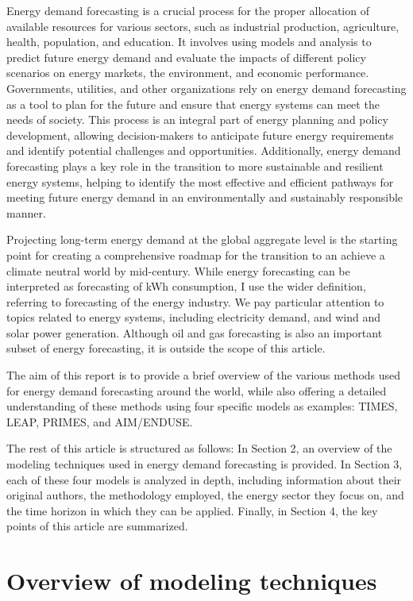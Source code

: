 \documentclass[lettersize,journal]{IEEEtran}
\begin{document}
Energy demand forecasting is a crucial process for the proper allocation of available resources for various sectors, such as industrial production, agriculture, health, population, and education. It involves using models and analysis to predict future energy demand and evaluate the impacts of different policy scenarios on energy markets, the environment, and economic performance. Governments, utilities, and other organizations rely on energy demand forecasting as a tool to plan for the future and ensure that energy systems can meet the needs of society. This process is an integral part of energy planning and policy development, allowing decision-makers to anticipate future energy requirements and identify potential challenges and opportunities. Additionally, energy demand forecasting plays a key role in the transition to more sustainable and resilient energy systems, helping to identify the most effective and efficient pathways for meeting future energy demand in an environmentally and sustainably responsible manner.

Projecting long-term energy demand at the global aggregate level is the starting point for creating a comprehensive roadmap for the transition to an achieve a climate neutral world by mid-century\cite{UNFCCC}. While energy forecasting can be interpreted as forecasting of kWh consumption, I use the wider definition, referring to forecasting of the energy industry. We pay particular attention to topics related to energy systems, including electricity demand, and wind and solar power generation. Although oil and gas forecasting is also an important subset of energy forecasting, it is outside the scope of this article.

The aim of this report is to provide a brief overview of the various methods used for energy demand forecasting around the world, while also offering a detailed understanding of these methods using four specific models as examples: TIMES, LEAP, PRIMES, and AIM/ENDUSE.

The rest of this article is structured as follows: In Section 2, an overview of the modeling techniques used in energy demand forecasting is provided. In Section 3, each of these four models is analyzed in depth, including information about their original authors, the methodology employed, the energy sector they focus on, and the time horizon in which they can be applied. Finally, in Section 4, the key points of this article are summarized.



\section{Overview of modeling techniques}
\end{document}
